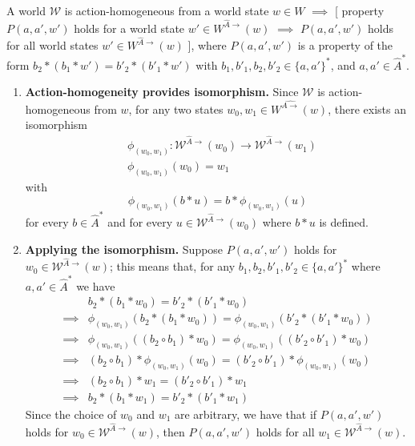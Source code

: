 \begin{propositionE}
    \label{prp:action_homogeneous_means_properties_for_w_hold_for_all_reachable_subworld}
    A world $\mathscr{W}$ is action-homogeneous from a world state $w \in W$ $\implies$ [ property $P(a, a', w')$ holds for a world state $w' \in W^{\hat{A}\to}(w)$ $\implies$ $P(a, a', w')$ holds for all world states $w' \in W^{\hat{A}\to}(w)$ ], where $P(a, a', w')$ is a property of the form $b_{2} \ast (b_{1} \ast w') = b'_{2} \ast (b'_{1} \ast w')$ with $b_{1}, b'_{1}, b_{2}, b'_{2} \in \{a, a'\}^{*}$, and $a, a' \in \hat{A}^{*}$.
\end{propositionE}
\begin{proofE}
\begin{enumerate}
    \item \textbf{Action-homogeneity provides isomorphism.}
    Since $\mathscr{W}$ is action-homogeneous from $w$, for any two states $w_{0}, w_{1} \in W^{\hat{A\to}}(w)$, there exists an isomorphism
    \begin{align}
        & \phi_{(w_{0}, w_{1})}: \mathscr{W}^{\hat{A}\to}(w_{0}) \to \mathscr{W}^{\hat{A}\to}(w_{1}) \\
        & \phi_{(w_{0}, w_{1})}(w_{0}) = w_{1}
    \end{align}
    with
    \begin{equation}
        \phi_{(w_{0}, w_{1})}(b \ast u) = b \ast \phi_{(w_{0}, w_{1})}(u)
    \end{equation}
    for every $b \in \hat{A}^{*}$ and for every $u \in \mathscr{W}^{\hat{A}\to}(w_{0})$ where $b \ast u$ is defined.

    \item \textbf{Applying the isomorphism.}
    Suppose $P(a, a', w')$ holds for $w_{0} \in \mathscr{W}^{\hat{A}\to}(w)$; this means that, for any $b_{1}, b_{2}, b'_{1}, b'_{2} \in \{a, a'\}^{*}$ where $a,a' \in \hat{A}^{*}$ we have
    \begin{align}
        & b_{2} \ast (b_{1} \ast w_{0}) = b'_{2} \ast (b'_{1} \ast w_{0}) \\
        \implies & \phi_{(w_{0}, w_{1})}(b_{2} \ast (b_{1} \ast w_{0})) = \phi_{(w_{0}, w_{1})}(b'_{2} \ast (b'_{1} \ast w_{0})) \\
        \implies & \phi_{(w_{0}, w_{1})}((b_{2} \circ b_{1}) \ast w_{0}) = \phi_{(w_{0}, w_{1})}((b'_{2} \circ b'_{1}) \ast w_{0}) \\
        \implies & (b_{2} \circ b_{1}) \ast \phi_{(w_{0}, w_{1})}(w_{0}) = (b'_{2} \circ b'_{1}) \ast \phi_{(w_{0}, w_{1})}(w_{0}) \\
        \implies & (b_{2} \circ b_{1}) \ast w_{1} = (b'_{2} \circ b'_{1}) \ast w_{1} \\
        \implies & b_{2} \ast (b_{1} \ast w_{1}) = b'_{2} \ast (b'_{1} \ast w_{1})
    \end{align}
    Since the choice of $w_{0}$ and $w_{1}$ are arbitrary, we have that if $P(a, a', w')$ holds for $w_{0} \in \mathscr{W}^{\hat{A}\to}(w)$, then $P(a, a', w')$ holds for all $w_{1} \in \mathscr{W}^{\hat{A}\to}(w)$.
\end{enumerate}
\end{proofE}


